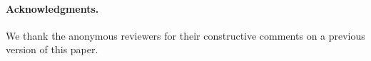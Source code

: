 \documentclass[submission,copyright,creativecommons]{eptcs}
\begin{document}
 


\paragraph{Acknowledgments.} 
We thank the anonymous reviewers for their constructive comments on a previous version of this paper.



 
 
 
 

 
\end{document}
